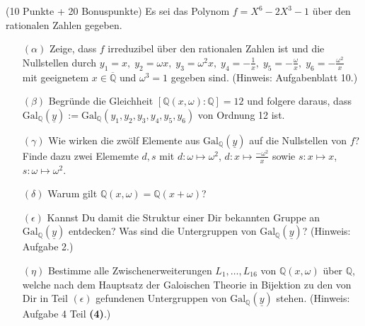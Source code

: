 \documentclass[a4paper,10pt]{algsheet}
\begin{document}
\begin{exercise}(10 Punkte + 20 Bonuspunkte)\newline
Es sei das Polynom \(f=X^6 - 2 X^3 - 1\) über den rationalen Zahlen gegeben.
\begin{itemize}
 \item[$(\alpha)$] Zeige, dass $f$ irreduzibel über den rationalen Zahlen ist
                   und die Nullstellen durch 
         $y_1=x,\;y_2=\omega x,\;y_3=\omega^2 x,\;
             y_4=-\frac{1}{x},\;y_5=-\frac{\omega}{x},
             \;y_6=-\frac{\omega^2}{x}$ 
mit geeignetem $x\in\overline{\mathbb Q}$
 und $\omega^3=1$ gegeben sind. (Hinweis: Aufgabenblatt 10.)

\item[$(\beta)$] Begründe die Gleichheit $[\mathbb{Q}(x,\omega)\colon\mathbb Q]=12$  
 und folgere daraus, dass\newline 
  $\mathrm{Gal}_\mathbb Q(\underline y):=\mathrm{Gal}_\mathbb Q(y_1,y_2,y_3,y_4,y_5,y_6)$ von Ordnung 12 ist.

\item[$(\gamma)$] Wie wirken die zwölf Elemente aus $\mathrm{Gal}_\mathbb Q(\underline y)$ 
   auf die Nullstellen von $f$? Finde dazu zwei Elememte $d,s$ mit $d\colon\omega\mapsto\omega^2$, 
  $d\colon x\mapsto\frac{-\omega^2}{x}$ sowie $s\colon x\mapsto x$, $s\colon\omega\mapsto\omega^2$.

\item[$(\delta)$] Warum gilt $\mathbb{Q}(x,\omega)=\mathbb{Q}(x+\omega)$?

\item[$(\epsilon)$] Kannst Du damit die Struktur einer
             Dir bekannten Gruppe an $\mathrm{Gal}_\mathbb Q(\underline y)$ entdecken? Was sind
             die Untergruppen von $\mathrm{Gal}_\mathbb Q(\underline y)$?
             (Hinweis: Aufgabe 2.)
\item[$(\eta)$] Bestimme alle Zwischenerweiterungen $L_1,\dots,L_{16}$ von 
                $\mathbb Q(x,\omega)$ über $\mathbb Q$, welche nach dem Hauptsatz der
             Galoischen Theorie in Bijektion zu den von Dir in Teil $(\epsilon)$
             gefundenen Untergruppen von $\mathrm{Gal}_\mathbb Q(\underline y)$
             stehen. (Hinweis: Aufgabe 4 Teil \textbf{(4)}.)
\end{itemize}



\end{exercise}
    
\end{document}
